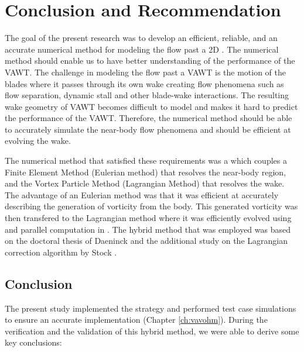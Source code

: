 \chapter{Conclusion and Recommendation}
\label{ch:ConclusionandRecommendation}

The goal of the present research was to develop an efficient, reliable, and an accurate numerical method for modeling the flow past a 2D . The numerical method should enable us to have better understanding of the performance of the VAWT. The challenge in modeling the flow past a VAWT is the motion of the blades where it passes through its own wake creating flow phenomena such as flow separation, dynamic stall and other blade-wake interactions. The resulting wake geometry of VAWT becomes difficult to model and makes it hard to predict the performance of the VAWT. Therefore, the numerical method should be able to accurately simulate the near-body flow phenomena and should be efficient at evolving the wake.

The numerical method that satisfied these requirements was a  which couples a Finite Element Method (Eulerian method) that resolves the near-body region, and the Vortex Particle Method (Lagrangian Method) that resolves the wake. The advantage of an Eulerian method was that it was efficient at accurately describing the generation of vorticity from the body. This generated vorticity was then transfered to the Lagrangian method where it was efficiently evolved using  and parallel computation in . The hybrid method that was employed was based on the doctoral thesis of Daeninck \cite{Daeninck2006} and the additional study on the Lagrangian correction algorithm by Stock \cite{Stock2010a}. 

\section{Conclusion}

The present study implemented the strategy and performed test case simulations to ensure an accurate implementation (Chapter \ref{ch:vavohm}). During the verification and the validation of this hybrid method, we were able to derive some key conclusions:

